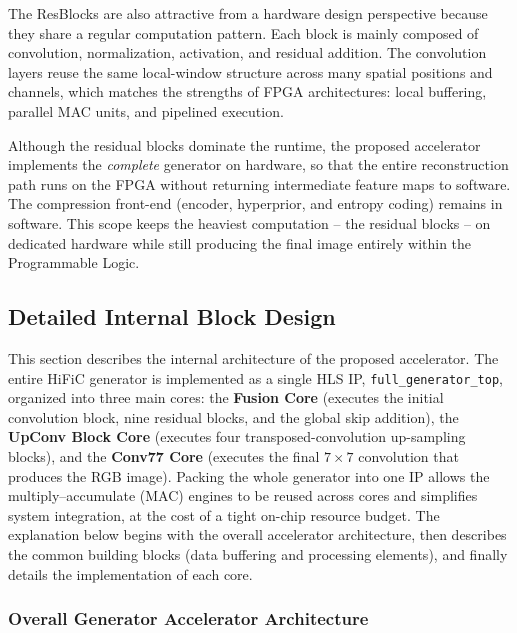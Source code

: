 The ResBlocks are also attractive from a hardware design perspective because they share a regular computation pattern. Each block is mainly composed of convolution, normalization, activation, and residual addition. The convolution layers reuse the same local-window structure across many spatial positions and channels, which matches the strengths of FPGA architectures: local buffering, parallel MAC units, and pipelined execution.

Although the residual blocks dominate the runtime, the proposed accelerator implements the \emph{complete} generator on hardware, so that the entire reconstruction path runs on the FPGA without returning intermediate feature maps to software. The compression front-end (encoder, hyperprior, and entropy coding) remains in software. This scope keeps the heaviest computation -- the residual blocks -- on dedicated hardware while still producing the final image entirely within the Programmable Logic.

\subsection{Detailed Internal Block Design}

This section describes the internal architecture of the proposed accelerator. The entire HiFiC generator is implemented as a single HLS IP, \texttt{full\_generator\_top}, organized into three main cores: the \textbf{Fusion Core} (executes the initial convolution block, nine residual blocks, and the global skip addition), the \textbf{UpConv Block Core} (executes four transposed-convolution up-sampling blocks), and the \textbf{Conv77 Core} (executes the final $7\times7$ convolution that produces the RGB image). Packing the whole generator into one IP allows the multiply--accumulate (MAC) engines to be reused across cores and simplifies system integration, at the cost of a tight on-chip resource budget. The explanation below begins with the overall accelerator architecture, then describes the common building blocks (data buffering and processing elements), and finally details the implementation of each core.

\subsubsection{Overall Generator Accelerator Architecture}

